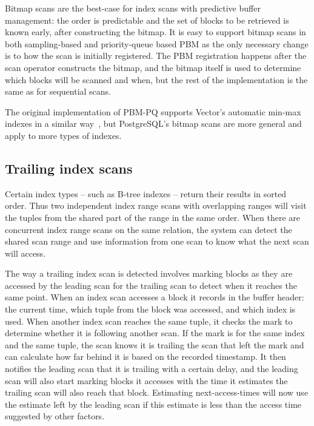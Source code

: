Bitmap scans are the best-case for index scans with predictive buffer management: the order is predictable and the set of blocks to be retrieved is known early, after constructing the bitmap. It is easy to support bitmap scans in both sampling-based and priority-queue based PBM as the only necessary change is to how the scan is initially registered. The PBM registration happens after the scan operator constructs the bitmap, and the bitmap itself is used to determine which blocks will be scanned and when, but the rest of the implementation is the same as for sequential scans.

The original implementation of PBM-PQ supports Vector's automatic min-max indexes in a similar way~\cite{pbm}, but PostgreSQL's bitmap scans are more general and apply to more types of indexes.


\subsection{Trailing index scans}
\label{sec:idx_trailing}

Certain index types -- such as B-tree indexes -- return their results in sorted order. Thus two independent index range scans with overlapping ranges will visit the tuples from the shared part of the range in the same order. When there are concurrent index range scans on the same relation, the system can detect the shared scan range and use information from one scan to know what the next scan will access.

The way a trailing index scan is detected involves marking blocks as they are accessed by the leading scan for the trailing scan to detect when it reaches the same point. When an index scan accesses a block it records in the buffer header: the current time, which tuple from the block was accessed, and which index is used. When another index scan reaches the same tuple, it checks the mark to determine whether it is following another scan. If the mark is for the same index and the same tuple, the scan knows it is trailing the scan that left the mark and can calculate how far behind it is based on the recorded timestamp. It then notifies the leading scan that it is trailing with a certain delay, and the leading scan will also start marking blocks it accesses with the time it estimates the trailing scan will also reach that block. Estimating next-access-times will now use the estimate left by the leading scan if this estimate is less than the access time suggested by other factors.

